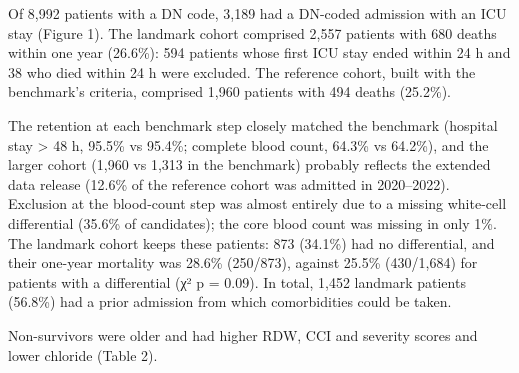 Of 8,992 patients with a DN code, 3,189 had a DN-coded admission with an ICU
stay (Figure 1). The landmark cohort comprised 2,557 patients with 680 deaths
within one year (26.6\%): 594 patients whose first ICU stay ended within 24 h
and 38 who died within 24 h were excluded. The reference cohort, built with the
benchmark's criteria, comprised 1,960 patients with 494 deaths (25.2\%).

The retention at each benchmark step closely matched the benchmark (hospital
stay \textgreater{} 48 h, 95.5\% vs 95.4\%; complete blood count, 64.3\% vs
64.2\%), and the larger cohort (1,960 vs 1,313 in the benchmark) probably
reflects the extended data release (12.6\% of the reference cohort was admitted
in 2020--2022). Exclusion at the blood-count step was almost entirely due to a
missing white-cell differential (35.6\% of candidates); the core blood count was
missing in only 1\%. The landmark cohort keeps these patients: 873 (34.1\%) had
no differential, and their one-year mortality was 28.6\% (250/873), against
25.5\% (430/1,684) for patients with a differential (χ² p = 0.09). In total,
1,452 landmark patients (56.8\%) had a prior admission from which comorbidities
could be taken.

Non-survivors were older and had higher RDW, CCI and severity scores and lower
chloride (Table 2).

